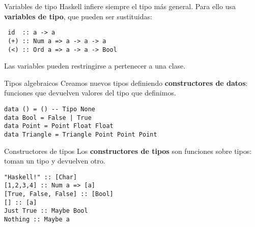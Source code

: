 \begin{frame}[fragile]{Variables de tipo}
  Haskell infiere siempre el tipo más general.
  Para ello usa \textbf{variables de tipo}, que pueden ser sustituidas:

  \espacio

  \begin{lstlisting}
 id  :: a -> a
 (+) :: Num a => a -> a -> a
 (<) :: Ord a => a -> a -> Bool
  \end{lstlisting}

  \espacio

  Las variables pueden restringirse a pertenecer a una clase.


\end{frame}

\begin{frame}[fragile]{Tipos algebraicos}
  Creamos nuevos tipos definiendo \textbf{constructores de datos}: funciones que
  devuelven valores del tipo que definimos.

  \espacio

  \begin{lstlisting}
data () = () -- Tipo None
data Bool = False | True
data Point = Point Float Float
data Triangle = Triangle Point Point Point
  \end{lstlisting}

\end{frame}

\begin{frame}[fragile]{Constructores de tipos}
  Los \textbf{constructores de tipos} son funciones sobre tipos:
   toman un tipo y devuelven otro.

  \espacio

  \begin{lstlisting}
"Haskell!" :: [Char]
[1,2,3,4] :: Num a => [a]
[True, False, False] :: [Bool]
[] :: [a]
Just True :: Maybe Bool
Nothing :: Maybe a
  \end{lstlisting}

\end{frame}

